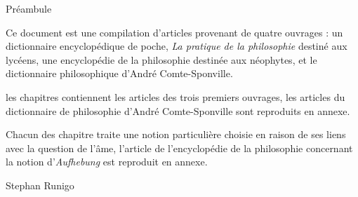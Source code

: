 
\thispagestyle{empty}

\begin{center}
\Large
Préambule
\normalsize
\end{center}
\vspace{3cm}


Ce document est une compilation d'articles provenant de quatre ouvrages : un dictionnaire encyclopédique de poche, {\it La pratique de la philosophie} destiné aux lycéens, une encyclopédie de la philosophie destinée aux néophytes, et le dictionnaire philosophique d'André Comte-Sponville.

\vspace{1.3cm}

les chapitres contiennent les articles des trois premiers ouvrages, les articles du dictionnaire de philosophie d'André Comte-Sponville sont reproduits en annexe.

Chacun des chapitre traite une notion particulière choisie en raison de ses liens avec la question de l'âme,
l'article de l'encyclopédie de la philosophie concernant la notion d'{\it Aufhebung} est reproduit en annexe.



\vspace{1.3cm}


\vspace{1.3cm}


\vspace{2.3cm}

\hfill Stephan Runigo


